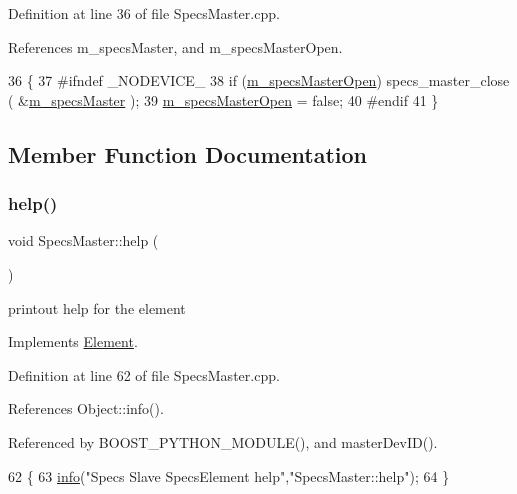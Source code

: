 Definition at line 36 of file Specs\+Master.\+cpp.



References m\+\_\+specs\+Master, and m\+\_\+specs\+Master\+Open.


\begin{DoxyCode}
36                          \{
37 \textcolor{preprocessor}{#ifndef \_NODEVICE\_
}
38   \textcolor{keywordflow}{if} (\hyperlink{classSpecsMaster_aff461467e5aa5fdc853bfeecbd722db4}{m\_specsMasterOpen}) specs\_master\_close ( &\hyperlink{classSpecsMaster_a32497dbb9887b6c546113135f3acc6b1}{m\_specsMaster} );
39   \hyperlink{classSpecsMaster_aff461467e5aa5fdc853bfeecbd722db4}{m\_specsMasterOpen} = \textcolor{keyword}{false};
40 \textcolor{preprocessor}{#endif
}
41 \}
\end{DoxyCode}


\subsection{Member Function Documentation}
\mbox{\label{classSpecsMaster_ad96a7533c46f01c0f67f330f6fdbf94a}} 
\subsubsection{\texorpdfstring{help()}{help()}}
{\footnotesize\ttfamily void Specs\+Master\+::help (\begin{DoxyParamCaption}{ }\end{DoxyParamCaption})\hspace{0.3cm}{\ttfamily [virtual]}}

printout help for the element 

Implements \hyperlink{classElement_a32c0de27acb08e17251cef88c3e9303a}{Element}.



Definition at line 62 of file Specs\+Master.\+cpp.



References Object\+::info().



Referenced by B\+O\+O\+S\+T\+\_\+\+P\+Y\+T\+H\+O\+N\+\_\+\+M\+O\+D\+U\+L\+E(), and master\+Dev\+I\+D().


\begin{DoxyCode}
62                         \{
63     \hyperlink{classObject_a644fd329ea4cb85f54fa6846484b84a8}{info}(\textcolor{stringliteral}{"Specs Slave SpecsElement help"},\textcolor{stringliteral}{"SpecsMaster::help"});
64 \}
\end{DoxyCode}
\mbox{\label{classSpecsMaster_a121457b9c5dff70caf24349c51d37cf5}} 
